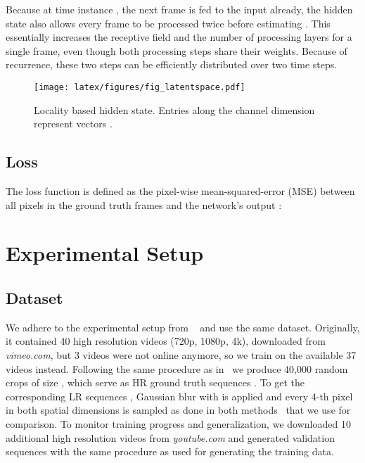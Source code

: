 \documentclass[10pt,twocolumn,letterpaper]{article}
\begin{document}
Because at time instance , the next frame  is fed to the input already, the hidden state also allows every frame  to be processed twice before estimating . This essentially increases the receptive field and the number of processing layers for a single frame, even though both processing steps share their weights. Because of recurrence, these two steps can be efficiently distributed over two time steps. 




\begin{figure}
\begin{center}
\texttt{[image: latex/figures/fig\_latentspace.pdf]}
\end{center}
\vspace{-0.14cm}
   \caption{Locality based hidden state. Entries along the channel dimension represent vectors .}
\label{fig:latentspace}
\vspace{-0.14cm}

\end{figure}

\subsection{Loss}
The loss function is defined as the pixel-wise mean-squared-error (MSE) between all  pixels in the ground truth frames  and the network's output :

\section{Experimental Setup}

\subsection{Dataset}
We adhere to the experimental setup from ~\cite{frvsr} and use the same dataset. Originally, it contained 40 high resolution videos (720p, 1080p, 4k), downloaded from \textit{vimeo.com}, but 3 videos were not online anymore, so we train on the available 37 videos instead. Following the same procedure as in~\cite{frvsr} we produce 40,000 random crops of size , which serve as HR ground truth sequences . To get the corresponding LR sequences , Gaussian blur with  is applied and every 4-th pixel in both spatial dimensions is sampled as done in both methods~\cite{frvsr, duf} that we use for comparison.
\newline
To monitor training progress and generalization, we downloaded 10 additional high resolution videos from \textit{youtube.com} and generated validation sequences with the same procedure as used for generating the training data.
\end{document}
